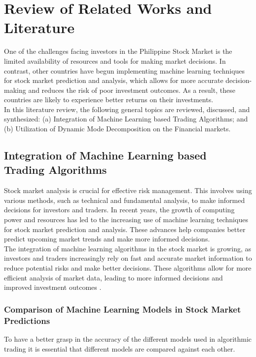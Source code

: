 \chapter{Review of Related Works and Literature}
\label{chap:lit_review}
One of the challenges facing investors in the Philippine Stock Market 
is the limited availability of resources and tools for 
making market decisions. In contrast, other countries have begun 
implementing machine learning techniques for stock market prediction and analysis, 
which allows for more accurate decision-making and reduces the risk of poor 
investment outcomes. As a result, these countries are likely to experience 
better returns on their investments.
\\In this literature review, the following general topics are reviewed, 
discussed, and synthesized: (a) Integration of Machine Learning based 
Trading Algorithms; and (b) Utilization of Dynamic Mode Decomposition on the 
Financial markets.

\section{Integration of Machine Learning based \\Trading Algorithms}
\label{sec:integration_ml}
Stock market analysis is crucial for effective risk management. 
This involves using various methods, such as technical and fundamental 
analysis, to make informed decisions for investors and traders. 
In recent years, the growth of computing power and resources has 
led to the increasing use of machine learning techniques for stock market 
prediction and analysis. These advances help companies better predict upcoming 
market trends and make more informed decisions.
\\The integration of machine learning algorithms in the stock market is growing, 
as investors and traders increasingly rely on fast and accurate market information 
to reduce potential risks and make better decisions. These algorithms allow for 
more efficient analysis of market data, leading to more informed decisions and 
improved investment outcomes
\cite{Obthong2020}.

\subsection{Comparison of Machine Learning Models in Stock Market Predictions}
\label{subsec:comparison_ml}
To have a better grasp in the accuracy of the different models 
used in algorithmic trading it is essential that different models are 
compared against each other.
